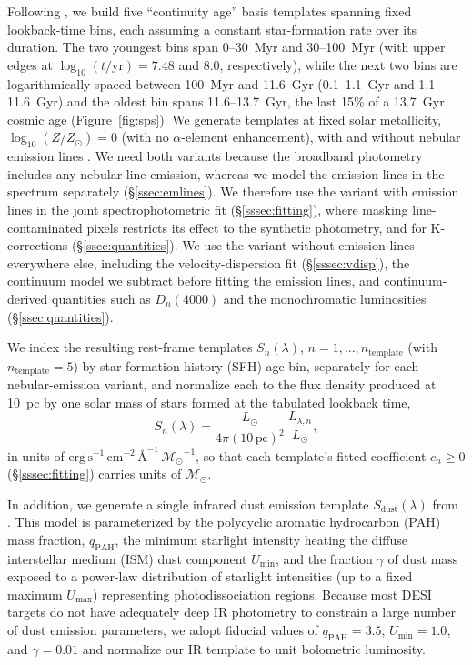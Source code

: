 \documentclass[modern,linenumbers]{aastex702}
\newcommand{\msun}{\ensuremath{\mathcal{M}_{\odot}}}
\begin{document}
Following \citet{leja17a}, we build five ``continuity age'' basis
templates spanning fixed lookback-time bins, each assuming a constant
star-formation rate over its duration. The two youngest bins span
0--30~Myr and 30--100~Myr (with upper edges at
$\log_{10}(t/\mathrm{yr}) = 7.48$ and $8.0$, respectively), while the
next two bins are logarithmically spaced between
  100~Myr and 11.6~Gyr (0.1--1.1~Gyr and 1.1--11.6~Gyr) and the oldest
  bin spans 11.6--13.7~Gyr, the last 15\% of a 13.7~Gyr cosmic age
(Figure~\ref{fig:sps}). We generate templates at fixed solar
metallicity, $\log_{10}(Z/Z_\odot) = 0$ (with no $\alpha$-element
enhancement), with
  and without nebular emission lines \citep{byler17a}. We need both
  variants because the broadband photometry includes any nebular line
  emission, whereas we model the emission lines in the spectrum
  separately (\S\ref{ssec:emlines}). We therefore use the variant with
  emission lines in the joint spectrophotometric fit
  (\S\ref{sssec:fitting}), where masking line-contaminated pixels
  restricts its effect to the synthetic photometry, and for
  K-corrections (\S\ref{ssec:quantities}). We use the variant without
  emission lines everywhere else, including the velocity-dispersion
  fit (\S\ref{sssec:vdisp}), the continuum model we subtract before
  fitting the emission lines, and continuum-derived quantities such as
  $D_n(4000)$ and the monochromatic luminosities
  (\S\ref{ssec:quantities}).

We index the resulting rest-frame templates $S_n(\lambda)$, $n =
1,\ldots,n_\mathrm{template}$ (with $n_\mathrm{template}=5$) by
star-formation history (SFH) age bin, separately for each
nebular-emission variant, and
normalize each to the flux density produced at 10~pc by one solar mass
of stars formed at the tabulated lookback time,
\begin{equation}
  S_n(\lambda) =
  \frac{L_\odot}{4\pi(10\,\mathrm{pc})^2}\,\frac{L_{\lambda,n}}{L_\odot},
  \label{eq:fnorm}
\end{equation}
in units of
$\mathrm{erg\,s^{-1}\,cm^{-2}\,\text{\AA}^{-1}\,\msun^{-1}}$, so that
each template's fitted coefficient $c_n \geq 0$
(\S\ref{sssec:fitting}) carries units of \msun.

In addition, we generate a single infrared dust emission template
$S_\mathrm{dust}(\lambda)$ from \citet{draine07a}. This model is
parameterized by the polycyclic aromatic hydrocarbon (PAH) mass
fraction, $q_\mathrm{PAH}$, the minimum starlight intensity heating
the diffuse interstellar medium (ISM) dust component $U_\mathrm{min}$,
and the fraction $\gamma$ of dust mass exposed to a power-law
distribution of starlight intensities (up to a fixed maximum
$U_\mathrm{max}$) representing photodissociation regions. Because most
DESI targets do not have adequately deep IR photometry to constrain a
large number of dust emission parameters, we adopt fiducial values of
$q_\mathrm{PAH} = 3.5$, $U_\mathrm{min} = 1.0$, and $\gamma = 0.01$
and normalize our IR template to unit bolometric luminosity.
\end{document}
